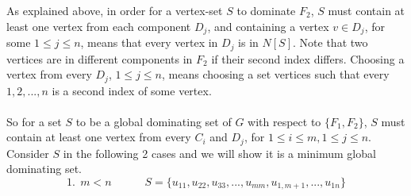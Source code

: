 \documentclass[letterpaper, 11pt]{article}
\newcommand{\1}{\mathds{1}}	%
\theoremstyle{definition}
\begin{document}
\begin{center}


\end{center}
As explained above, in order for a vertex-set $S$ to dominate $F_2$, $S$ must contain at least one vertex from each component $D_j$, and containing a vertex $v \in D_j$, for some $1 \le j \le n$, means that every vertex in $D_j$ is in $N[S]$. Note that two vertices are in different components in $F_2$ if their second index differs. Choosing a vertex from every $D_j$, $1 \le j \le n$, means choosing a set vertices such that every $1,2,...,n$ is a second index of some vertex.~\\ ~\\
So for a set $S$ to be a global dominating set of $G$ with respect to $\{F_1, F_2\}$, $S$ must contain at least one vertex from every $C_i$ and $D_j$, for $1 \le i \le m, 1 \le j \le n$. Consider $S$ in the following 2 cases and we will show it is a minimum global dominating set.  \[
1. \ \ m < n \quad \quad \quad S = \{u_{11}, u_{22}, u_{33}, ..., u_{mm}, u_{1,m+1}, ..., u_{1n}\}
\]
\end{document}
